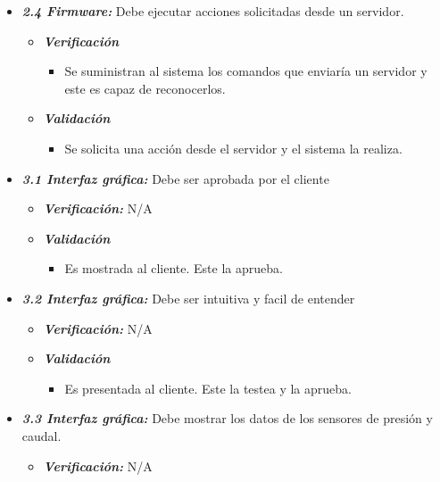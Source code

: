 \documentclass[11pt]{charter}
\begin{document}
\begin{itemize}
	\item \textit{\textbf{2.4 Firmware:}} Debe ejecutar acciones solicitadas desde un servidor.
	\begin{itemize}
		\item \textit{ \textbf{Verificación}}
		\begin{itemize}
			\item Se suministran al sistema los comandos que enviaría un servidor y este es capaz de reconocerlos.
		\end{itemize}
		
		\item \textit{\textbf{Validación}}
		\begin{itemize}
			\item Se solicita una acción desde el servidor y el sistema la realiza.
		\end{itemize}
	\end{itemize}
	
	\item \textit{\textbf{3.1 Interfaz gráfica:}} Debe ser aprobada por el cliente
	\begin{itemize}
		\item \textit{ \textbf{Verificación:}} N/A
		
		\item \textit{\textbf{Validación}}
		\begin{itemize}
			\item Es mostrada al cliente. Este la aprueba.	
		\end{itemize}			
	\end{itemize}
	
	\item \textit{\textbf{3.2 Interfaz gráfica:}} Debe ser intuitiva y facil de entender
	\begin{itemize}
		\item \textit{ \textbf{Verificación:}} N/A
		
		\item \textit{\textbf{Validación}}
		\begin{itemize}
			\item Es presentada al cliente. Este la testea y la aprueba.
		\end{itemize}
	\end{itemize}
	
	\item \textit{\textbf{3.3 Interfaz gráfica:}} Debe mostrar los datos de los sensores de presión y caudal.
	\begin{itemize}
		\item \textit{ \textbf{Verificación:}} N/A
		

\end{itemize}
\end{itemize}
\end{document}
